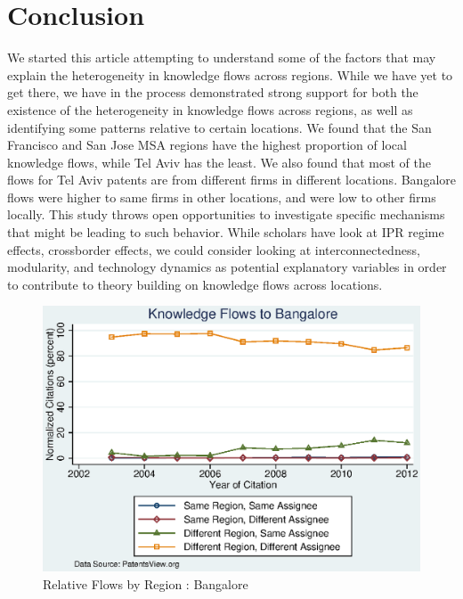\documentclass[12pt]{article}
\begin{document}
\section{Conclusion}
We started this article attempting to understand some of the factors that may explain the heterogeneity in knowledge flows across regions. While we have yet to get there, we have in the process demonstrated strong support for both the existence of the heterogeneity in knowledge flows across regions, as well as identifying some patterns relative to certain locations. We found that the San Francisco and San Jose MSA regions have the highest proportion of local knowledge flows, while Tel Aviv has the least. We also found that most of the flows for Tel Aviv patents are from different firms in different locations. Bangalore flows were higher to same firms in other locations, and were low to other firms locally. This study throws open opportunities to investigate specific mechanisms that might be leading to such behavior. While scholars have look at IPR regime effects, crossborder effects, we could consider looking at interconnectedness, modularity, and technology dynamics as potential explanatory variables in order to contribute to theory building on knowledge flows across locations.
\newpage

\singlespacing


 


\appendix
\begin{figure}[h]
\begin{centering}
  \includegraphics[width=\textwidth]{BangaloreNormalized}
  \caption{Relative Flows by Region : Bangalore}
  \label{fig:BangaloreNormalized}
\end{centering}
\end{figure}
\end{document}
